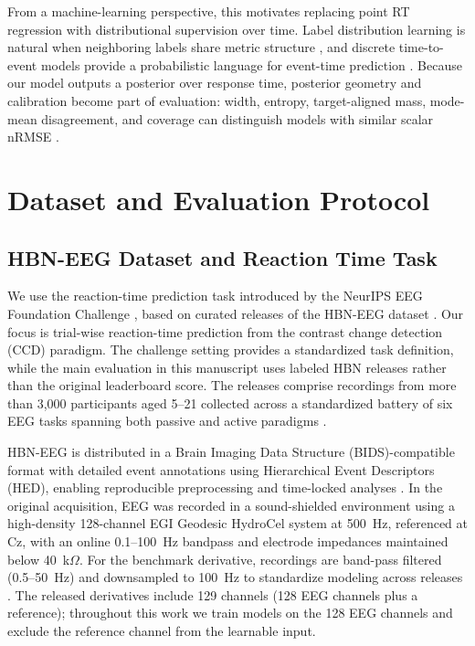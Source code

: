 \documentclass[12pt]{article}
\begin{document}
From a machine-learning perspective, this motivates replacing point RT regression with distributional supervision over time. Label distribution learning is natural when neighboring labels share metric structure \citep{Geng2016LabelDistributionLearning}, and discrete time-to-event models provide a probabilistic language for event-time prediction \citep{Cox1972CoxPH,Lee2018DeepHit}. Because our model outputs a posterior over response time, posterior geometry and calibration become part of evaluation: width, entropy, target-aligned mass, mode-mean disagreement, and coverage can distinguish models with similar scalar nRMSE \citep{Chapfuwa2023Calibration,Haider2020SurvivalDistributions}.


\section{Dataset and Evaluation Protocol}

\subsection{HBN-EEG Dataset and Reaction Time Task}

We use the reaction-time prediction task introduced by the NeurIPS EEG Foundation Challenge \citep{EEGChallengeWebsite2025,EEGFoundationChallengeArxiv2025}, based on curated releases of the HBN-EEG dataset \citep{Shirazi2024HBNEEG}. Our focus is trial-wise reaction-time prediction from the contrast change detection (CCD) paradigm. The challenge setting provides a standardized task definition, while the main evaluation in this manuscript uses labeled HBN releases rather than the original leaderboard score. The releases comprise recordings from more than 3{,}000 participants aged 5--21 collected across a standardized battery of six EEG tasks spanning both passive and active paradigms \citep{Shirazi2024HBNEEG,EEGChallengeWebsite2025}.

HBN-EEG is distributed in a Brain Imaging Data Structure (BIDS)-compatible format with detailed event annotations using Hierarchical Event Descriptors (HED), enabling reproducible preprocessing and time-locked analyses \citep{Shirazi2024HBNEEG}. In the original acquisition, EEG was recorded in a sound-shielded environment using a high-density 128-channel EGI Geodesic HydroCel system at 500~Hz, referenced at Cz, with an online 0.1--100~Hz bandpass and electrode impedances maintained below 40~k$\Omega$. For the benchmark derivative, recordings are band-pass filtered (0.5--50~Hz) and downsampled to 100~Hz to standardize modeling across releases \citep{EEGChallengeWebsite2025}. The released derivatives include 129 channels (128 EEG channels plus a reference); throughout this work we train models on the 128 EEG channels and exclude the reference channel from the learnable input.
\end{document}
